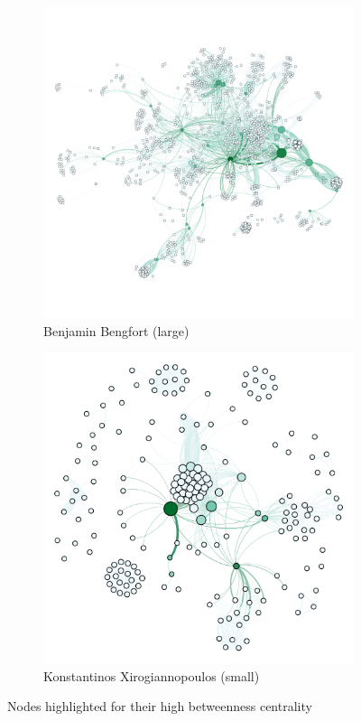 \documentclass[11pt,letterpaper]{article}
\begin{document}
\begin{figure}[h]
	\centering
	\begin{subfigure}{0.49\textwidth}
		\centering
		\includegraphics[width=\textwidth]{figures/benjamin_centrality.png}
		\caption{\textsf{Benjamin Bengfort (large)}}
        \label{fig:benjamin_centrality}
	\end{subfigure} \hfill
	\begin{subfigure}{0.49\textwidth}
		\centering
		\includegraphics[width=\textwidth]{figures/kostas_centrality.png}
		\caption{\textsf{Konstantinos Xirogiannopoulos (small)}}
        \label{fig:kostas_centrality}
	\end{subfigure}
    \caption{\textsf{Nodes highlighted for their high betweenness centrality}}
    \label{fig:centrality}
\end{figure}
\end{document}
